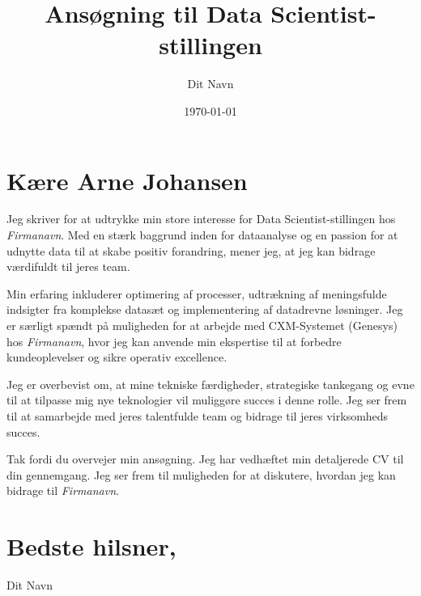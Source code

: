 \documentclass[a4paper]{article.cls}
\begin{document}
    \title{Ansøgning til Data Scientist-stillingen}
    \author{Dit Navn}
    \date{\today}

    \maketitle

    \section*{Kære Arne Johansen}

    Jeg skriver for at udtrykke min store interesse for Data Scientist-stillingen hos \emph{Firmanavn}. Med en stærk baggrund inden for dataanalyse og en passion for at udnytte data til at skabe positiv forandring, mener jeg, at jeg kan bidrage værdifuldt til jeres team.

    Min erfaring inkluderer optimering af processer, udtrækning af meningsfulde indsigter fra komplekse datasæt og implementering af datadrevne løsninger. Jeg er særligt spændt på muligheden for at arbejde med CXM-Systemet (Genesys) hos \emph{Firmanavn}, hvor jeg kan anvende min ekspertise til at forbedre kundeoplevelser og sikre operativ excellence.

    Jeg er overbevist om, at mine tekniske færdigheder, strategiske tankegang og evne til at tilpasse mig nye teknologier vil muliggøre succes i denne rolle. Jeg ser frem til at samarbejde med jeres talentfulde team og bidrage til jeres virksomheds succes.

    Tak fordi du overvejer min ansøgning. Jeg har vedhæftet min detaljerede CV til din gennemgang. Jeg ser frem til muligheden for at diskutere, hvordan jeg kan bidrage til \emph{Firmanavn}.

    \section*{Bedste hilsner,}

    Dit Navn
\end{document}
